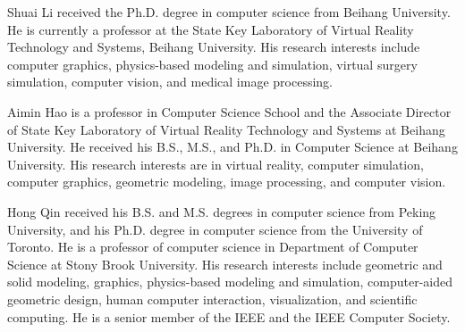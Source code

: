 \documentclass[10pt,journal,compsoc]{IEEEtran}
\begin{document}
 \vspace{-10 mm}
\begin{IEEEbiography}{Shuai Li} received the Ph.D. degree in computer science from Beihang University. He is currently a professor at the State Key Laboratory of Virtual Reality Technology and Systems, Beihang University. His research interests include computer graphics, physics-based modeling and simulation, virtual surgery simulation, computer vision, and medical image processing. 
\end{IEEEbiography}
\vspace{-10 mm}

 \vspace{-10 mm}
\begin{IEEEbiography}{Aimin Hao} is a professor in Computer Science School and the Associate Director of State Key Laboratory of Virtual Reality Technology and Systems at Beihang University. He received his B.S., M.S., and Ph.D. in Computer Science at Beihang University. His research interests are in virtual reality, computer simulation, computer graphics, geometric modeling, image processing, and computer vision. 
\end{IEEEbiography}  
\vspace{-10 mm}

 \vspace{-10 mm}
\begin{IEEEbiography}{Hong Qin} received his B.S. and M.S. degrees in computer science from Peking University, and his Ph.D. degree in computer science from the University of Toronto. He is a professor of computer science in Department of Computer Science at Stony Brook University. His research interests include geometric and solid modeling, graphics, physics-based modeling and simulation, computer-aided geometric design, human computer interaction, visualization, and scientific computing. He is a senior member of the IEEE and the IEEE Computer Society.
\end{IEEEbiography}
\end{document}
